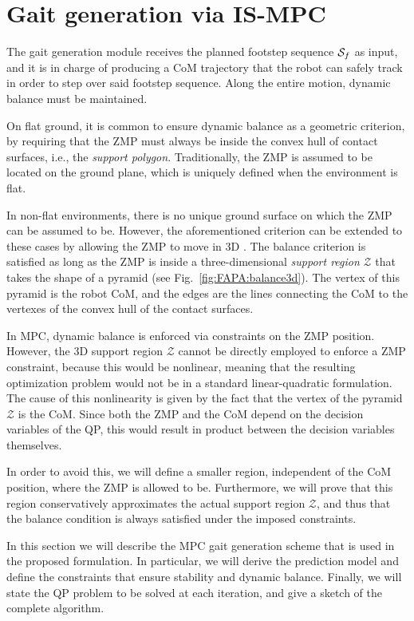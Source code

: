 \chapter{Gait generation via IS-MPC}
\label{ch:ISMPC}
The gait generation module receives the planned footstep sequence ${\cal S}_f$ as input, and it is in charge of producing a CoM trajectory that the robot can safely track in order to step over said footstep sequence. Along the entire motion, dynamic balance must be maintained.

On flat ground, it is common to ensure dynamic balance as a geometric criterion, by requiring that the ZMP must always be inside the convex hull of contact surfaces, i.e., the \emph{support polygon}. Traditionally, the ZMP is assumed to be located on the ground plane, which is uniquely defined when the environment is flat.

In non-flat environments, there is no unique ground surface on which the ZMP can be assumed to be. However, the aforementioned criterion can be extended to these cases by allowing the ZMP to move in 3D \cite{Sugihara2021ICRA}. The balance criterion is satisfied as long as the ZMP is inside a three-dimensional \emph{support region} $\mathcal{Z}$ that takes the shape of a pyramid (see Fig.~\ref{fig:FAPA:balance3d}). The vertex of this pyramid is the robot CoM, and the edges are the lines connecting the CoM to the vertexes of the convex hull of the contact surfaces.

In MPC, dynamic balance is enforced via constraints on the ZMP position. However, the 3D support region $\mathcal{Z}$ cannot be directly employed to enforce a ZMP constraint, because this would be nonlinear, meaning that the resulting optimization problem would not be in a standard linear-quadratic formulation. The cause of this nonlinearity is given by the fact that the vertex of the pyramid $\mathcal{Z}$ is the CoM. Since both the ZMP and the CoM depend on the decision variables of the QP, this would result in product between the decision variables themselves.

In order to avoid this, we will define a smaller region, independent of the CoM position, where the ZMP is allowed to be. Furthermore, we will prove that this region conservatively approximates the actual support region $\mathcal{Z}$, and thus that the balance condition is always satisfied under the imposed constraints.

In this section we will describe the MPC gait generation scheme that is used in the proposed formulation. In particular, we will derive the prediction model and define the constraints that ensure stability and dynamic balance. Finally, we will state the QP problem to be solved at each iteration, and give a sketch of the complete algorithm.

